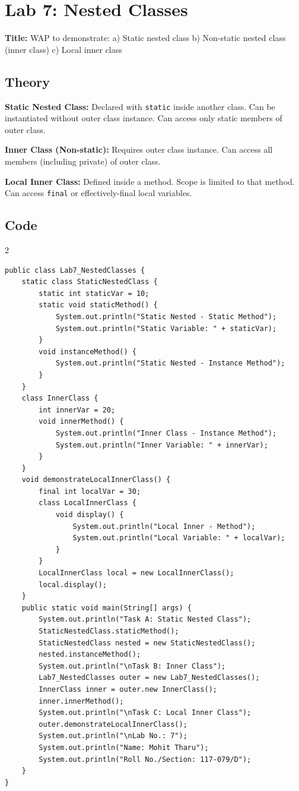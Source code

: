 \documentclass[10pt,a4paper]{article}
\begin{document}
\newpage
\section*{Lab 7: Nested Classes}

\textbf{Title:} WAP to demonstrate: a) Static nested class b) Non-static nested class (inner class) c) Local inner class

\subsection*{Theory}
\textbf{Static Nested Class:} Declared with \texttt{static} inside another class. Can be instantiated without outer class instance. Can access only static members of outer class.

\textbf{Inner Class (Non-static):} Requires outer class instance. Can access all members (including private) of outer class.

\textbf{Local Inner Class:} Defined inside a method. Scope is limited to that method. Can access \texttt{final} or effectively-final local variables.

\subsection*{Code}
\begin{multicols}{2}
\begin{lstlisting}
public class Lab7_NestedClasses {
    static class StaticNestedClass {
        static int staticVar = 10;
        static void staticMethod() {
            System.out.println("Static Nested - Static Method");
            System.out.println("Static Variable: " + staticVar);
        }
        void instanceMethod() {
            System.out.println("Static Nested - Instance Method");
        }
    }
    class InnerClass {
        int innerVar = 20;
        void innerMethod() {
            System.out.println("Inner Class - Instance Method");
            System.out.println("Inner Variable: " + innerVar);
        }
    }
    void demonstrateLocalInnerClass() {
        final int localVar = 30;
        class LocalInnerClass {
            void display() {
                System.out.println("Local Inner - Method");
                System.out.println("Local Variable: " + localVar);
            }
        }
        LocalInnerClass local = new LocalInnerClass();
        local.display();
    }
    public static void main(String[] args) {
        System.out.println("Task A: Static Nested Class");
        StaticNestedClass.staticMethod();
        StaticNestedClass nested = new StaticNestedClass();
        nested.instanceMethod();
        System.out.println("\nTask B: Inner Class");
        Lab7_NestedClasses outer = new Lab7_NestedClasses();
        InnerClass inner = outer.new InnerClass();
        inner.innerMethod();
        System.out.println("\nTask C: Local Inner Class");
        outer.demonstrateLocalInnerClass();
        System.out.println("\nLab No.: 7");
        System.out.println("Name: Mohit Tharu");
        System.out.println("Roll No./Section: 117-079/D");
    }
}
\end{lstlisting}
\end{multicols}
\end{document}

